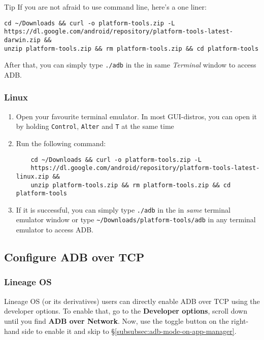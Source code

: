 \begin{tip}{Tip}
    If you are not afraid to use command line, here's a one liner:
    \begin{verbatim}
cd ~/Downloads && curl -o platform-tools.zip -L
https://dl.google.com/android/repository/platform-tools-latest-darwin.zip &&
unzip platform-tools.zip && rm platform-tools.zip && cd platform-tools
    \end{verbatim}
    After that, you can simply type \texttt{./adb} in the in same \textit{Terminal} window to access ADB\@.
\end{tip}

\subsubsection{Linux}
\begin{enumerate}
    \item Open your favourite terminal emulator. In most GUI-distros, you can open it by holding \texttt{Control},
    \texttt{Alter} and \texttt{T} at the same time
    \item Run the following command:
    \begin{verbatim}
    cd ~/Downloads && curl -o platform-tools.zip -L
    https://dl.google.com/android/repository/platform-tools-latest-linux.zip &&
    unzip platform-tools.zip && rm platform-tools.zip && cd platform-tools
    \end{verbatim}
    \item If it is successful, you can simply type \texttt{./adb} in the in \textit{same} terminal emulator window or
    type \texttt{\textasciitilde/Downloads/platform-tools/adb} in any terminal emulator to access ADB\@.
\end{enumerate}

\subsection{Configure ADB over TCP}\label{subsec:configure-adb-over-tcp}

\subsubsection{Lineage OS}\label{subsubsec:lineage-os}
Lineage OS (or its derivatives) users can directly enable ADB over TCP using the developer options. To enable that,
go to the \textbf{Developer options}, scroll down until you find \textbf{ADB over Network}. Now, use the toggle button
on the right-hand side to enable it and skip to §\cref{subsubsec:adb-mode-on-app-manager}.

